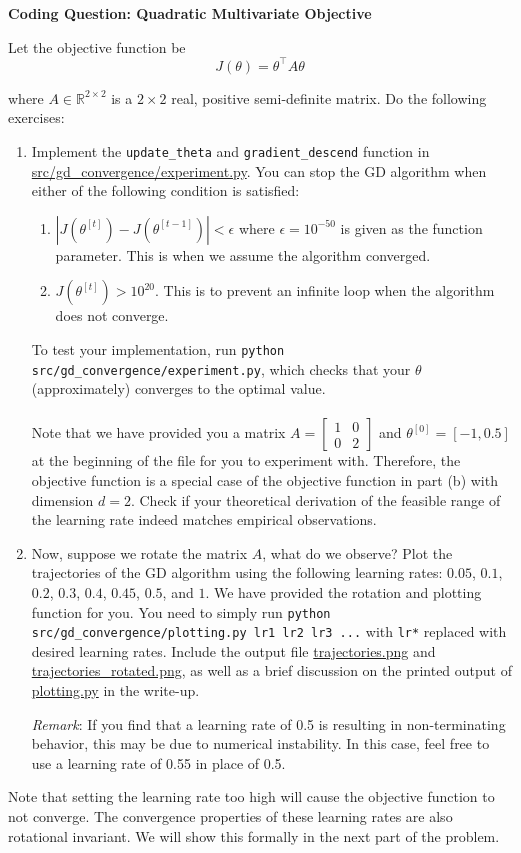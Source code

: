 \item {} {\bf Coding Question: Quadratic Multivariate Objective}

Let the objective function be 
\begin{equation*}
	J(\theta) = \theta^\top A\theta
\end{equation*}

where $A\in\mathbb{R}^{2\times 2}$ is a $2 \times 2$ real, positive semi-definite matrix. Do the following exercises:

\begin{enumerate}
	\item Implement the \texttt{update\_theta} and \texttt{gradient\_descend} function in \url{src/gd_convergence/experiment.py}. You can stop the GD algorithm when either of the following condition is satisfied:
	\begin{enumerate}
		\item $|J(\theta^{[t]}) - J(\theta^{[t-1]})| < \epsilon$ where $\epsilon=10^{-50}$ is given as the function parameter. This is when we assume the algorithm converged. 
		\item $J(\theta^{[t]}) > 10^{20}$. This is to prevent an infinite loop when the algorithm does not converge.
	\end{enumerate}
	To test your implementation, run \texttt{python src/gd\_convergence/experiment.py}, which checks that your $\theta$ (approximately) converges to the optimal value. \\
	\\
	Note that we have provided you a matrix $A=\begin{bmatrix} 1 & 0 \\ 0 & 2 \end{bmatrix}$ and $\theta^{[0]} = [-1, 0.5]$ at the beginning of the file for you to experiment with. Therefore, the objective function is a special case of the objective function in part (b) with dimension $d=2$. Check if your theoretical derivation of the feasible range of the learning rate indeed matches empirical observations. 
	\item Now, suppose we rotate the matrix $A$, what do we observe?
	Plot the trajectories of the GD algorithm using the following learning rates: $0.05$, $0.1$, $0.2$, $0.3$, $0.4$, $0.45$, $0.5$, and $1$. We have provided the rotation and plotting function for you. You need to simply run \texttt{python src/gd\_convergence/plotting.py lr1 lr2 lr3 ...} with \texttt{lr*} replaced with desired learning rates. Include the output file \url{trajectories.png} and \url{trajectories_rotated.png}, as well as a brief discussion on the printed output of \url{plotting.py} in the write-up.

    \textit{Remark}: If you find that a learning rate of 0.5 is resulting in non-terminating behavior, this may be due to numerical instability. In this case, feel free to use a learning rate of 0.55 in place of 0.5.

\end{enumerate}

Note that setting the learning rate too high will cause the objective function to not converge. The convergence properties of these learning rates are also rotational invariant. We will show this formally in the next part of the problem.